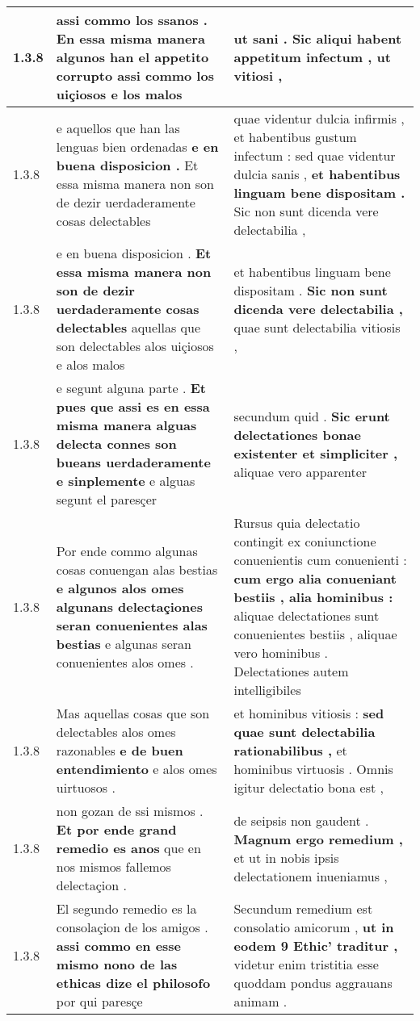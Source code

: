 \begin{tabular}{|p{1cm}|p{6.5cm}|p{6.5cm}|}
1.3.8 & assi commo los ssanos . \textbf{ En essa misma manera algunos han el appetito corrupto } assi commo los uiçiosos e los malos & ut sani . \textbf{ Sic aliqui habent appetitum infectum , } ut vitiosi , \\\hline
1.3.8 & e aquellos que han las lenguas bien ordenadas \textbf{ e en buena disposicion . } Et essa misma manera non son de dezir uerdaderamente cosas delectables & quae videntur dulcia infirmis , et habentibus gustum infectum : sed quae videntur dulcia sanis , \textbf{ et habentibus linguam bene dispositam . } Sic non sunt dicenda vere delectabilia , \\\hline
1.3.8 & e en buena disposicion . \textbf{ Et essa misma manera non son de dezir uerdaderamente cosas delectables } aquellas que son delectables alos uiçiosos e alos malos & et habentibus linguam bene dispositam . \textbf{ Sic non sunt dicenda vere delectabilia , } quae sunt delectabilia vitiosis , \\\hline
1.3.8 & e segunt alguna parte . \textbf{ Et pues que assi es en essa misma manera alguas delecta connes son bueans uerdaderamente e sinplemente } e alguas segunt el paresçer & secundum quid . \textbf{ Sic erunt delectationes bonae existenter et simpliciter , } aliquae vero apparenter \\\hline
1.3.8 & Por ende commo algunas cosas conuengan alas bestias \textbf{ e algunos alos omes algunans delectaçiones seran conuenientes alas bestias } e algunas seran conuenientes alos omes . & Rursus quia delectatio contingit ex coniunctione conuenientis cum conuenienti : \textbf{ cum ergo alia conueniant bestiis , alia hominibus : } aliquae delectationes sunt conuenientes bestiis , aliquae vero hominibus . Delectationes autem intelligibiles \\\hline
1.3.8 & Mas aquellas cosas que son delectables alos omes razonables \textbf{ e de buen entendimiento } e alos omes uirtuosos . & et hominibus vitiosis : \textbf{ sed quae sunt delectabilia rationabilibus , } et hominibus virtuosis . Omnis igitur delectatio bona est , \\\hline
1.3.8 & non gozan de ssi mismos . \textbf{ Et por ende grand remedio es anos } que en nos mismos fallemos delectaçion . & de seipsis non gaudent . \textbf{ Magnum ergo remedium , } et ut in nobis ipsis delectationem inueniamus , \\\hline
1.3.8 & El segundo remedio es la consolaçion de los amigos . \textbf{ assi commo en esse mismo nono de las ethicas dize el philosofo } por qui paresçe & Secundum remedium est consolatio amicorum , \textbf{ ut in eodem 9 Ethic’ traditur , } videtur enim tristitia esse quoddam pondus aggrauans animam . \\\hline

\end{tabular}
